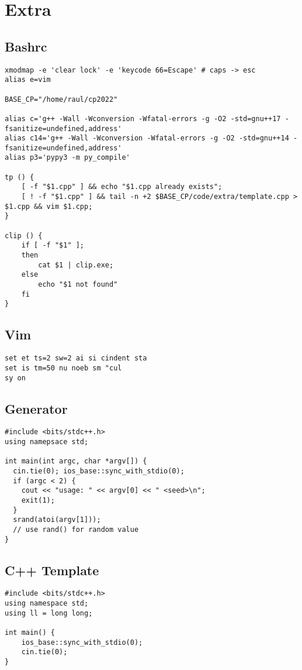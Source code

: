 \documentclass[12pt, a4paper, twoside]{article}
\begin{document}

\section{Extra}

\subsection{Bashrc}
\begin{lstlisting}
xmodmap -e 'clear lock' -e 'keycode 66=Escape' # caps -> esc
alias e=vim

BASE_CP="/home/raul/cp2022"

alias c='g++ -Wall -Wconversion -Wfatal-errors -g -O2 -std=gnu++17 -fsanitize=undefined,address'
alias c14='g++ -Wall -Wconversion -Wfatal-errors -g -O2 -std=gnu++14 -fsanitize=undefined,address'
alias p3='pypy3 -m py_compile'

tp () {
	[ -f "$1.cpp" ] && echo "$1.cpp already exists";
	[ ! -f "$1.cpp" ] && tail -n +2 $BASE_CP/code/extra/template.cpp > $1.cpp && vim $1.cpp;
}

clip () {
	if [ -f "$1" ];
	then
		cat $1 | clip.exe;
	else
		echo "$1 not found"
	fi
}
\end{lstlisting}

\subsection{Vim}
\begin{lstlisting}
set et ts=2 sw=2 ai si cindent sta
set is tm=50 nu noeb sm "cul
sy on
\end{lstlisting}

\subsection{Generator}
\begin{lstlisting}
#include <bits/stdc++.h>
using namepsace std;

int main(int argc, char *argv[]) {
  cin.tie(0); ios_base::sync_with_stdio(0);
  if (argc < 2) {
    cout << "usage: " << argv[0] << " <seed>\n";
    exit(1);
  }
  srand(atoi(argv[1]));
  // use rand() for random value
}
\end{lstlisting}

\subsection{C++ Template}
\begin{lstlisting}
#include <bits/stdc++.h>
using namespace std;
using ll = long long;

int main() {
	ios_base::sync_with_stdio(0);
	cin.tie(0);
}
\end{lstlisting}
\end{document}
